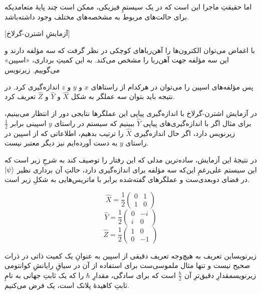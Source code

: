 اما حقیقتِ ماجرا این است که در یک سیستمِ فیزیکی، ممکن است چند پایهٔ متعامدیکه برای  حالت‌های مربوط به مشخصه‌های مختلف وجود داشته‌باشد.

[آزمایشِ اشترن-گرلاخ]


با اغماض می‌توان الکترون‌ها را آهن‌رباهای کوچکی در نظر گرفت که سه مؤلفه دارند و این سه مؤلفه جهت آهن‌ربا را مشخص می‌کند. به این کمیتِ برداری، «اسپین» می‌گوییم.
‌زیرنویس

پس مؤلفه‌های اسپین را می‌توان در هرکدام از راستاهای \(x\) و \(y\) و \(z\) اندازه‌گیری کرد. در نتیجه باید بتوان سه عملگر به شکل 
\(\hat{X}\)
و 
\(\hat{Y}\)
و 
\(\hat{Z}\)
تعریف کرد.

در آزمایش اشترن-گرلاخ با اندازه‌گیری پیاپی این عملگرها نتایجی دور از انتظار می‌بینیم، برای مثال اگر با اندازه‌گیری‌های پیاپی 
\(\hat{Y}\)
ببینیم که سیستم در راستای \(y\) اسپینی برابر 
\(\frac{1}{2}\)
‌زیرنویس
دارد، اگر حال اندازه‌گیری 
\(\hat{X}\)
را ترتیب بدهیم، اطلاعاتی که از اسپین در راستای \(y\) به دست آورده‌ایم نیز دیگر معتبر نیست.

در نتیجهٔ این آزمایش، ساده‌ترین مدلی که این رفتار را توصیف کند به شرحِ زیر است که این سیستم علی‌رغمِ این‌که سه مؤلفه برای اندازه‌گیری دارد، حالتِ آن برداری نظیر 
\(\ket{\psi}\)
در فضای دوبعدی‌ست و عملگرهای گفته‌شده برابر با ماتریس‌هایی به شکلِ زیر است.

\begin{equation} \hat{X} = \frac{1}{2} \begin{pmatrix} 0 & 1 \\ 1 & 0 \end{pmatrix} \end{equation}
\begin{equation} \hat{Y} = \frac{1}{2} \begin{pmatrix} 0 & -i \\ i & 0 \end{pmatrix} \end{equation}
\begin{equation} \hat{Z} = \frac{1}{2} \begin{pmatrix} 1 & 0 \\ 0 & -1 \end{pmatrix} \end{equation}

‌زیرنویس{این تعریف به هیچ‌وجه تعریف دقیقی از اسپین به عنوانِ یک کمیت ذاتی در ذرات صحیح نیست و تنها مثال ملموسی‌ست برای استفاده از آن در سیاقِ رایانشِ کوانتومی}
‌زیرنویس{مقدارِ دقیق‌ترِ آن 
\(\frac{\hbar}{2}\)
است که برای سادگی، مقدارِ 
\(\hbar\)
را که یک ثابتِ جهانی به نامِ ثابتِ کاهیدهٔ پلانک است، یک فرض می‌کنیم.}

